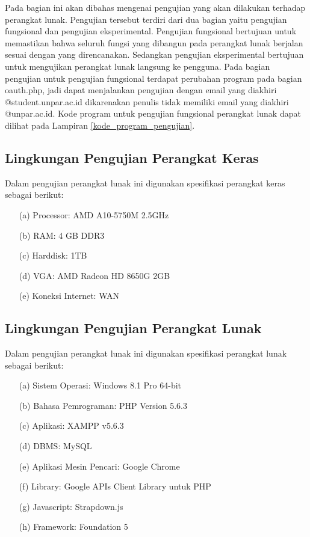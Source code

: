 Pada bagian ini akan dibahas mengenai pengujian yang akan dilakukan terhadap perangkat lunak. Pengujian tersebut terdiri dari dua bagian yaitu pengujian fungsional dan pengujian eksperimental. Pengujian fungsional bertujuan untuk memastikan bahwa seluruh fungsi yang dibangun pada perangkat lunak berjalan sesuai dengan yang direncanakan. Sedangkan pengujian eksperimental bertujuan untuk mengujikan perangkat lunak langsung ke pengguna. Pada bagian pengujian untuk pengujian fungsional terdapat perubahan program pada bagian oauth.php, jadi dapat menjalankan pengujian dengan email yang diakhiri @student.unpar.ac.id dikarenakan penulis tidak memiliki email yang diakhiri @unpar.ac.id. Kode program untuk pengujian fungsional perangkat lunak dapat dilihat pada Lampiran \ref{kode_program_pengujian}.

\subsection{Lingkungan Pengujian Perangkat Keras}
\label{sec:lingkunganpengujianperangkatkeras}

Dalam pengujian perangkat lunak ini digunakan spesifikasi perangkat keras sebagai berikut:

\begin{enumerate}
\item[(a)] Processor: AMD A10-5750M 2.5GHz
\item[(b)] RAM: 4 GB DDR3
\item[(c)] Harddisk: 1TB
\item[(d)] VGA: AMD Radeon HD 8650G 2GB
\item[(e)] Koneksi Internet: WAN
\end{enumerate}

\subsection{Lingkungan Pengujian Perangkat Lunak}
\label{sec:lingkunganpengujianperangkatlunak}

Dalam pengujian perangkat lunak ini digunakan spesifikasi perangkat lunak sebagai berikut:

\begin{enumerate}
\item[(a)] Sistem Operasi: Windows 8.1 Pro 64-bit
\item[(b)] Bahasa Pemrograman: PHP Version 5.6.3
\item[(c)] Aplikasi: XAMPP v5.6.3
\item[(d)] DBMS: MySQL
\item[(e)] Aplikasi Mesin Pencari: Google Chrome
\item[(f)] Library: Google APIs Client Library untuk PHP
\item[(g)] Javascript: Strapdown.js
\item[(h)] Framework: Foundation 5
\end{enumerate}

